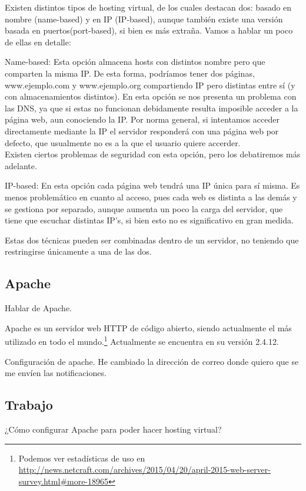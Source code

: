 \documentclass[a4paper, 10pt]{article} %
\begin{document}
Existen distintos tipos de hosting virtual, de los cuales destacan dos: basado en nombre (name-based) y en IP (IP-based), aunque también existe una versión basada en puertos(port-based), si bien es más extraña. Vamos a hablar un poco de ellas en detalle: 

Name-based: Esta opción almacena hosts con distintos nombre pero que comparten la misma IP. De esta forma, podríamos tener dos páginas, www.ejemplo.com y www.ejemplo.org compartiendo IP pero distintas entre sí (y con almacenamientos distintos). En esta opción se nos presenta un problema con las DNS, ya que si estas no funcionan debidamente resulta imposible acceder a la página web, aun conociendo la IP. Por norma general, si intentamos acceder directamente mediante la IP el servidor responderá con una página web por defecto, que usualmente no es a la que el usuario quiere accerder. \\
Existen ciertos problemas de seguridad con esta opción, pero los debatiremos más adelante. 

IP-based: En esta opción cada página web tendrá una IP única para sí misma. Es menos problemático en cuanto al acceso, pues cada web es distinta a las demás y se gestiona por separado, aunque aumenta un poco la carga del servidor, que tiene que escuchar distintas IP's, si bien esto no es significativo en gran medida. 

Estas dos técnicas pueden ser combinadas dentro de un servidor, no teniendo que restringirse únicamente a una de las dos. 

\subsection{Apache}

Hablar de Apache.

Apache es un servidor web HTTP de código abierto, siendo actualmente el más utilizado en todo el mundo.\footnote{Podemos ver estadísticas de uso en \url{http://news.netcraft.com/archives/2015/04/20/april-2015-web-server-survey.html\#more-18965}} Actualmente se encuentra en su versión 2.4.12.

Configuración de apache. He cambiado la dirección de correo donde quiero que se me envíen las notificaciones. 


\subsection{Trabajo}

¿Cómo configurar Apache para poder hacer hosting virtual? 
\end{document}
